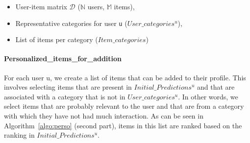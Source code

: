 \documentclass[runningheads]{llncs}
\begin{document}
\begin{algorithm}[!htb]
\tiny{
\DontPrintSemicolon
  
  \KwInput{}
  \begin{itemize}
      \item User-item matrix \( \mathcal{D} \) (\( \mathbb{N} \) users, \( \mathbb{M} \) items),
      \item Representative categories for user \texttt{u} ($User\_categories^{u}$), 
      \item List of items per category ($Item\_categories$)
      
  \end{itemize}
  
  
  

  
\caption{Personalized list of indicative items per user.}
\label{algo:perso}
}
\end{algorithm}

\paragraph{Personalized\_items\_for\_addition}
For each user {u}, we create a list of items that can be added to their profile. 
This involves selecting items that are present in \( Initial\_Predictions^{u} \) and that are associated with a category that is not in \( User\_categories^{u} \). 
In other words, we select items that are probably relevant to the user and that are from a category with which they have not had much interaction. 
As can be seen in Algorithm~\ref{algo:perso} (second part), items in this list are ranked based on the ranking in \( Initial\_Predictions^{u} \).
\end{document}
